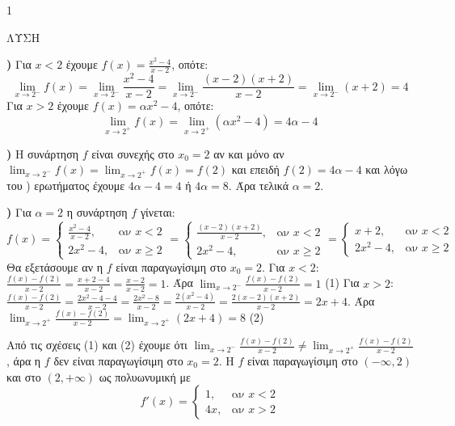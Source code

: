 \begin{ylh}{1}
    \item [Ύλη από εικόνα]
\end{ylh}
ΛΥΣΗ

\textbf{\textalpha)} Για $x<2$ έχουμε $f(x) = \frac{x^2-4}{x-2}$, οπότε:
\[ \lim_{x \to 2^-} f(x) = \lim_{x \to 2^-} \frac{x^2-4}{x-2} = \lim_{x \to 2^-} \frac{(x-2)(x+2)}{x-2} = \lim_{x \to 2^-} (x+2) = 4 \]
Για $x>2$ έχουμε $f(x) = \alpha x^2-4$, οπότε:
\[ \lim_{x \to 2^+} f(x) = \lim_{x \to 2^+} (\alpha x^2-4) = 4\alpha-4 \]

\textbf{\textbeta)} Η συνάρτηση $f$ είναι συνεχής στο $x_0=2$ αν και μόνο αν $\lim_{x \to 2^-} f(x) = \lim_{x \to 2^+} f(x) = f(2)$ και επειδή $f(2) = 4\alpha-4$ και λόγω του \textalpha) ερωτήματος έχουμε $4\alpha-4=4$ ή $4\alpha=8$. Άρα τελικά $\alpha=2$.

\textbf{\textgamma)} Για $\alpha=2$ η συνάρτηση $f$ γίνεται:
\[ f(x) = \begin{cases} \frac{x^2-4}{x-2}, & \text{αν } x < 2 \\ 2x^2-4, & \text{αν } x \ge 2 \end{cases} = \begin{cases} \frac{(x-2)(x+2)}{x-2}, & \text{αν } x < 2 \\ 2x^2-4, & \text{αν } x \ge 2 \end{cases} = \begin{cases} x+2, & \text{αν } x < 2 \\ 2x^2-4, & \text{αν } x \ge 2 \end{cases} \]
Θα εξετάσουμε αν η $f$ είναι παραγωγίσιμη στο $x_0=2$.
Για $x<2$: $\frac{f(x)-f(2)}{x-2} = \frac{x+2-4}{x-2} = \frac{x-2}{x-2} = 1$. Άρα $\lim_{x \to 2^-} \frac{f(x)-f(2)}{x-2} = 1$ (1)
Για $x>2$: $\frac{f(x)-f(2)}{x-2} = \frac{2x^2-4-4}{x-2} = \frac{2x^2-8}{x-2} = \frac{2(x^2-4)}{x-2} = \frac{2(x-2)(x+2)}{x-2} = 2x+4$.
Άρα $\lim_{x \to 2^+} \frac{f(x)-f(2)}{x-2} = \lim_{x \to 2^+} (2x+4) = 8$ (2)

Από τις σχέσεις (1) και (2) έχουμε ότι $\lim_{x \to 2^-} \frac{f(x)-f(2)}{x-2} \ne \lim_{x \to 2^+} \frac{f(x)-f(2)}{x-2}$, άρα η $f$ δεν είναι παραγωγίσιμη στο $x_0=2$.
Η $f$ είναι παραγωγίσιμη στο $(-\infty,2)$ και στο $(2,+\infty)$ ως πολυωνυμική με
\[ f'(x) = \begin{cases} 1, & \text{αν } x < 2 \\ 4x, & \text{αν } x > 2 \end{cases} \]